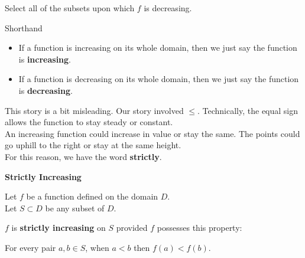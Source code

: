 \documentclass{ximera}
\begin{document}
\begin{example}
\begin{question}

Select all of the subsets upon which $f$ is decreasing.


\begin{selectAll}
\choice [correct]{$[-2,6)$}
\choice [correct]{$[6,8]$}
\end{selectAll}
\end{question}





\end{example}




\begin{remark}
Shorthand

  \begin{itemize}
    \item If a function is increasing on its whole domain, then we just say the function is \textbf{increasing}.
    \item If a function is decreasing on its whole domain, then we just say the function is \textbf{decreasing}.
  \end{itemize}
\end{remark}




This story is a bit misleading.  Our story involved $\leq$.  Technically, the equal sign allows the function to stay steady or constant. \\

An increasing function could increase in value or stay the same.  The points could go uphill to the right or stay at the same height. \\

For this reason, we have the word \textbf{strictly}.








\begin{definition} \textbf{\textcolor{green!50!black}{Strictly Increasing}} 


Let $f$ be a function defined on the domain $D$. \\
Let $S \subset D$ be any subset of $D$.

$f$ is \textbf{strictly increasing} on $S$ provided $f$ possesses this property:  


\begin{center}
For every pair $a, b \in S$, when $a < b$ then $f(a) < f(b)$.
\end{center}

\end{definition}
\end{document}
